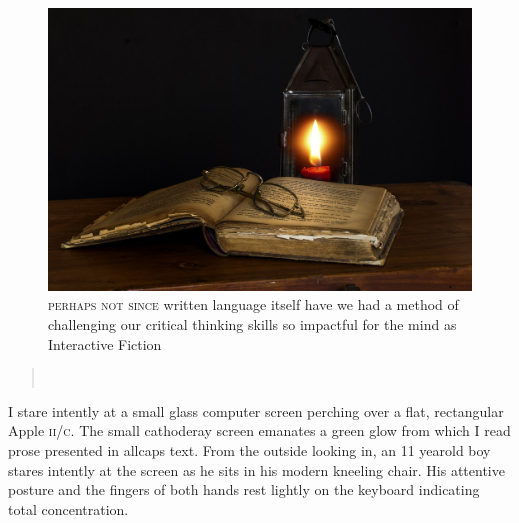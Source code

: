 \begin{figure}[h]                                                           
 \includegraphics[width=\linewidth]{./media/images/book_candle}%
  \scriptsize{\textsc{\\perhaps not since} written language itself have
    we had a method of challenging our critical thinking skills so impactful for the mind as Interactive Fiction}
  \label{fig:editorial}%
\end{figure}                                                                
\begin{quotation} 
\noindent{}\\[.5mm]
   \hfill{}
\end{quotation} 
\newpage
\lettrine[lines=3]{\color{BrickRed}I}{\enspace } stare intently at a small glass computer screen perching over a flat,
rectangular Apple \textsc{ii/c}. The small cathode\textendash ray screen emanates a green
glow from which I read prose presented in all\textendash caps text. From the outside looking in, an
11 year\textendash old boy stares intently at the screen as he sits in his modern 
kneeling chair. His attentive posture and the fingers of both hands rest lightly on the keyboard indicating total concentration. 

